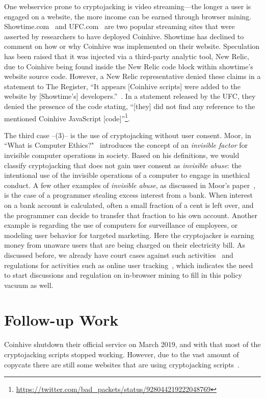 One webservice prone to cryptojacking is video streaming---the longer a user is engaged on a website, the more income can be earned through browser mining. Showtime.com~\cite{registershowtime} and UFC.com~\cite{registerufcmonero} are two popular streaming sites that were asserted by researchers to have deployed Coinhive. Showtime has declined to comment on how or why Coinhive was implemented on their website. Speculation has been raised that it was injected via a third-party analytic tool, New Relic, due to Coinhive being found inside the New Relic code block within showtime's website source code. However, a New Relic representative denied these claims in a statement to The Register, ``It appears [Coinhive scripts] were added to the website by [Showtime's] developers.''~\cite{registershowtime}. In a statement released by the UFC, they denied the presence of the code stating, ``[they] did not find any reference to the mentioned Coinhive JavaScript [code]''\footnote{\url{https://twitter.com/bad_packets/status/928044219222048769}}.

The third case --(3)-- is the use of cryptojacking without user consent. Moor, in ``What is Computer Ethics?"~\cite{moor1985computer} introduces the concept of an \textit{invisible factor} for invisible computer operations in society. Based on his definitions, we would classify cryptojacking that does not gain user consent as \textit{invisible abuse}: the intentional use of the invisible operations of a computer to engage in unethical conduct. A few other examples of \textit{invisible abuse}, as discussed in Moor's paper~\cite{moor1985computer}, is the case of a programmer stealing excess interest from a bank. When interest on a bank account is calculated, often a small fraction of a cent is left over, and the programmer can decide to transfer that fraction to his own account. Another example is regarding the use of computers for surveillance of employees, or modeling user behavior for targeted marketing. Here the cryptojacker is earning money from unaware users that are being charged on their electricity bill. As discussed before, we already have court cases against such activities~\cite{njcourtbitcoinjsminer} and regulations for activities such as online user tracking~\cite{eucookie}, which indicates the need to start discussions and regulation on in-browser mining to fill in this policy vacuum as well. 



\section{Follow-up Work}\label{sec:cryptojackingfollowup}
Coinhive shutdown their official service on March 2019, and with that most of the cryptojacking scripts stopped working. However, due to the vast amount of copycats there are still some websites that are using cryptojacking scripts~\cite{varlioglu2020cryptojacking}. 

